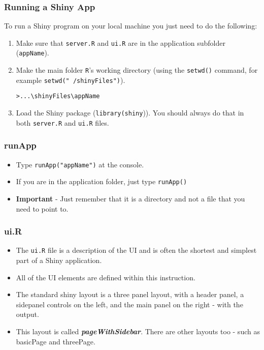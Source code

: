 \documentclass{beamer}
\begin{document}
\begin{frame}[fragile]
\frametitle{Running a Shiny App}
\Large
To run a Shiny program on your local machine you just need to do the following:
\begin{enumerate}
\item  Make sure that \texttt{server.R} and \texttt{ui.R} are in the application subfolder (\texttt{appName}).
\item Make the main folder \texttt{R}'s working directory (using the \texttt{setwd()} command, for
example \texttt{setwd("~/shinyFiles")}).
\begin{verbatim}
>...\shinyFiles\appName
\end{verbatim}
\item Load the Shiny package (\texttt{library(shiny})). You
should always do that in both \texttt{server.R} and \texttt{ui.R} files.
\end{enumerate}


\end{frame}
\begin{frame}
\frametitle{runApp}
\Large
\vspace{-1.5cm}
\begin{itemize}
\item Type \texttt{runApp("appName")} at the console.
\item If you are in the application folder, just type \texttt{runApp()}
\item \textbf{Important} - Just remember that it is a directory
and not a file that you need to point to.
\end{itemize}
\end{frame}
\begin{frame}
\frametitle{ui.R}
\Large
\begin{itemize}
\item The \texttt{ui.R} file is a description of the UI and is often the shortest and simplest part of
a Shiny application. \item All of the UI elements are defined
within this instruction.
\item The standard shiny layout is a three panel layout, with a header panel, a sidepanel 
controls on the left, and the main panel on the right - with the output.
\item This layout is called \textbf{\emph{pageWithSidebar}}. There are other layouts too - such as basicPage and threePage.
\end{itemize}

\end{frame}
\end{document}
